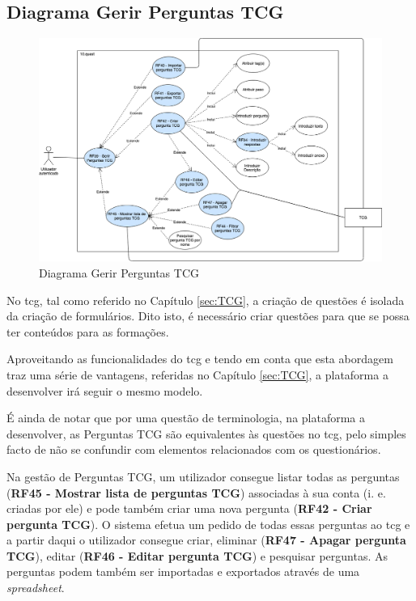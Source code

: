 \subsection{Diagrama Gerir Perguntas TCG}
\label{d:perguntastcg}
\begin{figure}[ht!]
	\begin{center}
		\includegraphics[width=1\textwidth]{img/rf/gerir-perguntas-tcg}
		\caption{Diagrama Gerir Perguntas TCG}
		\label{fig:rf-gerir-perguntas-tcg}
	\end{center}
\end{figure}

No \acrshort{tcg}, tal como referido no Capítulo \ref{sec:TCG}, a criação de questões é isolada da criação de formulários. Dito isto, é necessário criar questões para que se possa ter conteúdos para as formações. 

Aproveitando as funcionalidades do \acrshort{tcg} e  tendo em conta que esta abordagem traz uma série de vantagens, referidas no Capítulo \ref{sec:TCG}, a plataforma a desenvolver irá seguir o mesmo modelo. 

É ainda de notar que por uma questão de terminologia, na plataforma a desenvolver, as Perguntas TCG são equivalentes às questões no \acrshort{tcg}, pelo simples facto de não se confundir com elementos relacionados com os questionários.

Na gestão de Perguntas TCG, um utilizador consegue listar todas as perguntas (\textbf{RF45 - Mostrar lista de perguntas TCG}) associadas à sua conta (i. e. criadas por ele) e pode também criar uma nova pergunta (\textbf{RF42 - Criar pergunta TCG}). O sistema efetua um pedido de todas essas perguntas ao \acrshort{tcg} e a partir daqui o utilizador consegue criar, eliminar (\textbf{RF47 - Apagar pergunta TCG}), editar (\textbf{RF46 - Editar pergunta TCG}) e pesquisar perguntas. As perguntas podem também ser importadas e exportados através de uma \textit{spreadsheet}.

